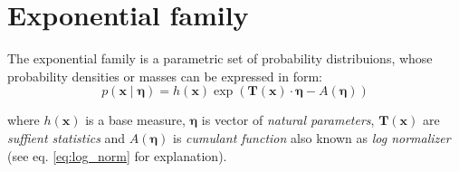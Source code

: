 \section{Exponential family}
The exponential family is a parametric set of probability distribuions, whose probability densities or masses can be expressed in form:
\begin{equation}
    p(\boldsymbol{x}\mid \boldsymbol{\eta}) = h(\boldsymbol{x}) \exp( \boldsymbol{T}(\boldsymbol{x}) \cdot \boldsymbol{\eta} - A(\boldsymbol{\eta})) \label{eq:exp-fam}
\end{equation}

where $h(\boldsymbol{x})$ is a base measure, $\boldsymbol{\eta}$ is vector of \textit{natural parameters}, 
$\boldsymbol{T}(\boldsymbol{x})$ are \textit{suffient statistics} and  $A(\boldsymbol{\eta})$ is \textit{cumulant function} 
also known as \textit{log normalizer} (see eq. \ref{eq:log_norm} for explanation).

